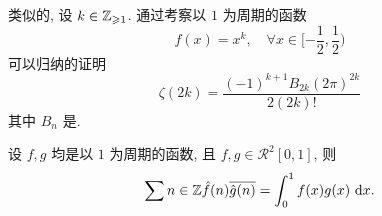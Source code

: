\begin{remark}
	类似的, 设 $k\in\mathbb Z_{\geqslant1}$. 通过考察以 $1$ 为周期的函数 $$f(x)=x^k,\quad\forall x\in[-\frac{1}{2},\frac 1 2)$$ 可以归纳的证明 $$\zeta(2k)=\frac{(-1)^{k+1}B_{2k}(2\pi)^{2k}}{2(2k)!}$$ 其中 $B_n$ 是.
\end{remark}

\begin{theorem}[广义帕塞瓦尔恒等式]\label{广义帕塞瓦尔恒等式}
	设 $f,g$ 均是以 $1$ 为周期的函数, 且 $f,g\in\mathscr{R}^2[0,1]$, 则 $$\sum\limits{n\in\mathbb Z}\hat f(n)\overline{\hat g (n)}=\int_0^1 f(x)g(x)\ \text {d} x.$$
\end{theorem}